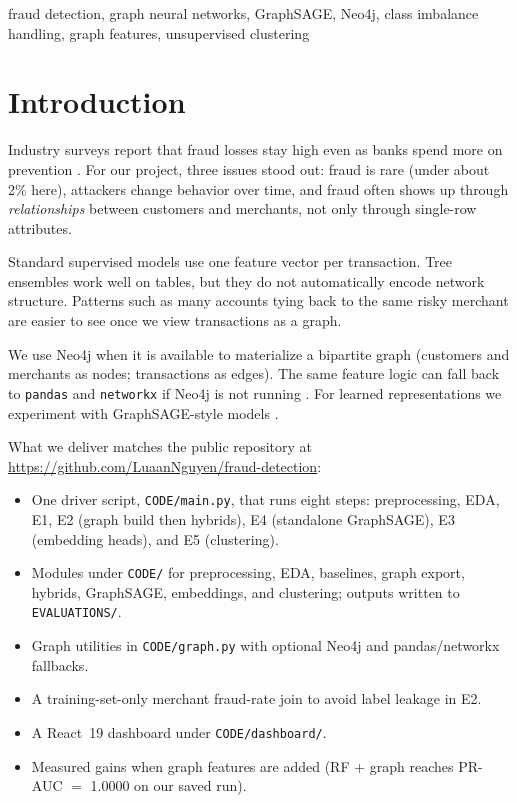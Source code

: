 \documentclass[conference]{IEEEtran}
\begin{document}
\begin{IEEEkeywords}
fraud detection, graph neural networks, GraphSAGE, Neo4j, class imbalance handling, graph features, unsupervised clustering
\end{IEEEkeywords}

\section{Introduction}

Industry surveys report that fraud losses stay high even as banks spend more on prevention \cite{b3}. For our project, three issues stood out: fraud is rare (under about 2\% here), attackers change behavior over time, and fraud often shows up through \textit{relationships} between customers and merchants, not only through single-row attributes.

Standard supervised models use one feature vector per transaction. Tree ensembles work well on tables, but they do not automatically encode network structure. Patterns such as many accounts tying back to the same risky merchant are easier to see once we view transactions as a graph.

We use Neo4j when it is available to materialize a bipartite graph (customers and merchants as nodes; transactions as edges). The same feature logic can fall back to \texttt{pandas} and \texttt{networkx} if Neo4j is not running \cite{b2}. For learned representations we experiment with GraphSAGE-style models \cite{b6}.

What we deliver matches the public repository at \url{https://github.com/LuaanNguyen/fraud-detection}:
\begin{itemize}
    \item One driver script, \texttt{CODE/main.py}, that runs eight steps: preprocessing, EDA, E1, E2 (graph build then hybrids), E4 (standalone GraphSAGE), E3 (embedding heads), and E5 (clustering).
    \item Modules under \texttt{CODE/} for preprocessing, EDA, baselines, graph export, hybrids, GraphSAGE, embeddings, and clustering; outputs written to \texttt{EVALUATIONS/}.
    \item Graph utilities in \texttt{CODE/graph.py} with optional Neo4j and pandas/networkx fallbacks.
    \item A training-set-only merchant fraud-rate join to avoid label leakage in E2.
    \item A React~19 dashboard under \texttt{CODE/dashboard/}.
    \item Measured gains when graph features are added (RF + graph reaches PR-AUC $=$ 1.0000 on our saved run).
\end{itemize}
\end{document}
